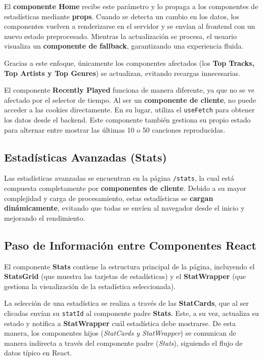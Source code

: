 El \textbf{componente Home} recibe este parámetro y lo propaga a los componentes de estadísticas mediante \textbf{props}. Cuando se detecta un cambio en los datos, los componentes vuelven a renderizarse en el servidor y se envían al frontend con un nuevo estado preprocesado. Mientras la actualización se procesa, el usuario visualiza un \textbf{componente de fallback}, garantizando una experiencia fluida.

Gracias a este enfoque, únicamente los componentes afectados (los \textbf{Top Tracks, Top Artists y Top Genres}) se actualizan, evitando recargas innecesarias.

El componente \textbf{Recently Played} funciona de manera diferente, ya que no se ve afectado por el selector de tiempo. Al ser un \textbf{componente de cliente}, no puede acceder a las cookies directamente. En su lugar, utiliza el \texttt{useFetch} para obtener los datos desde el backend. Este componente también gestiona su propio estado para alternar entre mostrar las últimas 10 o 50 canciones reproducidas.

\subsection{Estadísticas Avanzadas (Stats)}

Las estadísticas avanzadas se encuentran en la página \texttt{/stats}, la cual está compuesta completamente por \textbf{componentes de cliente}. Debido a su mayor complejidad y carga de procesamiento, estas estadísticas se \textbf{cargan dinámicamente}, evitando que todas se envíen al navegador desde el inicio y mejorando el rendimiento.

\subsection*{Paso de Información entre Componentes React}

El componente \textbf{Stats} contiene la estructura principal de la página, incluyendo el \textbf{StatsGrid} (que muestra las tarjetas de estadísticas) y el \textbf{StatWrapper} (que gestiona la visualización de la estadística seleccionada).

La selección de una estadística se realiza a través de las \textbf{StatCards}, que al ser clicadas envían su \texttt{statId} al componente padre \textbf{Stats}. Este, a su vez, actualiza su estado y notifica a \textbf{StatWrapper} cuál estadística debe mostrarse. De esta manera, los componentes hijos (\textit{StatCards y StatWrapper}) se comunican de manera indirecta a través del componente padre (\textit{Stats}), siguiendo el flujo de datos típico en React.

